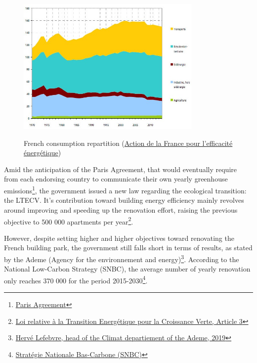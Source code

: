 \documentclass[12pt]{article}
\begin{document}
\begin{figure}
    \caption{French consumption repartition (\href{https://www.ecologie.gouv.fr/action-france-lefficacite-energetique}{Action de la France pour l’efficacité énergétique})}
    \centering
    \includegraphics[width=0.8\textwidth]{consumption_evolution_1970_2015.jpg}
    \label{consumption_repartition}
\end{figure}

Amid the anticipation of the Paris Agreement, that would eventually require from each endorsing country to communicate their own yearly greenhouse emissions\footnote{\href{https://unfccc.int/files/meetings/paris_nov_2015/application/pdf/paris_agreement_english_.pdf}{Paris Agreement}}, the government issued a new law regarding the ecological transition: the LTECV. It's contribution toward building energy efficiency mainly revolves around improving and speeding up the renovation effort, raising the previous objective to 500 000 apartments per year\footnote{\href{https://www.legifrance.gouv.fr/jorf/id/JORFTEXT000031044385/}{Loi relative à la Transition Energétique pour la Croissance Verte, Article 3}}.

However, despite setting higher and higher objectives toward renovating the French building park, the government still falls short in terms of results, as stated by the Ademe (Agency for the environnement and energy)\footnote{\href{https://www.lefigaro.fr/conjoncture/accord-de-paris-pourquoi-les-pays-ne-sont-pas-a-la-hauteur-de-leurs-engagements-20190419}{Hervé Lefebvre, head of the Climat departiement of the Ademe, 2019}}. According to the National Low-Carbon Strategy (SNBC), the average number of yearly renovation only reaches 370 000 for the period 2015-2030\footnote{\href{https://www.ecologie.gouv.fr/strategie-nationale-bas-carbone-snbc}{Stratégie Nationale Bas-Carbone (SNBC)}}.
\end{document}
